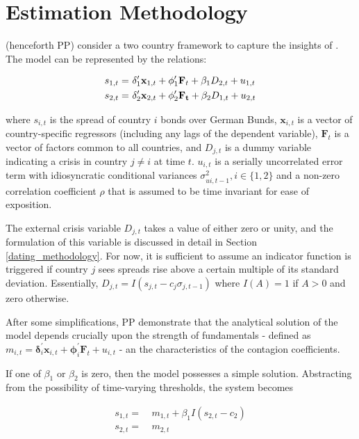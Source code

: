 \documentclass[../base.tex]{subfiles}
\begin{document}
\section{Estimation Methodology}
\label{est}

\cite{pesaran2007econometric} (henceforth PP) consider a two country framework to capture the insights of \cite{masson1999contagion}. The model can be represented by the relations:

\begin{align}
	s_{1,t} =&~\mathbf{\delta}_1^{\prime} \mathbf{x}_{1,t} + \mathbf{\phi}_1^{\prime} \mathbf{F}_t + \beta_1 D_{2,t} + u_{1,t} \\
	s_{2,t} =&~\boldmath{\delta}_2^{\prime} \mathbf{x}_{2,t} + \mathbf{\phi}_2^{\prime} \mathbf{F_t} + \beta_2 D_{1,t} + u_{2,t}
\end{align}

where $s_{i,t}$ is the spread of country $i$ bonds over German Bunds, $\mathbf{x}_{i,t}$ is a vector of country-specific regressors (including any lags of the dependent variable), $\mathbf{F}_t$ is a vector of factors common to all countries, and $D_{j, t}$ is a dummy variable indicating a crisis in country $j \neq i$ at time $t$. $u_{i, t}$ is a serially uncorrelated error term with idiosyncratic conditional variances $\sigma^2_{ui, t-1}, i \in \{1, 2\}$ and a non-zero correlation coefficient $\rho$ that is assumed to be time invariant for ease of exposition. 

The external crisis variable $D_{j, t}$ takes a value of either zero or unity, and the formulation of this variable is discussed in detail in Section \ref{dating_methodology}. For now, it is sufficient to assume an indicator function is triggered if country $j$ sees spreads rise above a certain multiple of its standard deviation. Essentially, $D_{j, t} = I(s_{j, t} - c_j \sigma_{j, t-1})$ where $I(A) = 1$ if $A >0$ and zero otherwise.

After some simplifications, PP demonstrate that the analytical solution of the model depends crucially upon the strength of fundamentals - defined as $m_{i,t} = \mathbf{\delta}_i^{\prime} \mathbf{x}_{i,t} + \mathbf{\phi}_i^{\prime} \mathbf{F}_t + u_{i,t}$ - an the characteristics of the contagion coefficients. 

If one of $\beta_1$ or $\beta_2$ is zero, then the model possesses a simple solution. Abstracting from the possibility of time-varying thresholds, the system becomes

\begin{align*}
	s_{1,t} =&~ m_{1,t} + \beta_1 I(s_{2,t} - c_2) \\
	s_{2,t} =&~ m_{2,t}
\end{align*}
\end{document}
